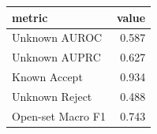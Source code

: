 \begin{tabular}{lr}
\toprule
metric & value \\
\midrule
Unknown AUROC & 0.587 \\
Unknown AUPRC & 0.627 \\
Known Accept & 0.934 \\
Unknown Reject & 0.488 \\
Open-set Macro F1 & 0.743 \\
\bottomrule
\end{tabular}
